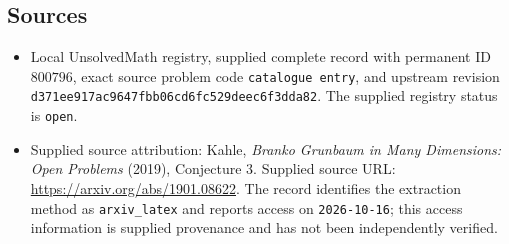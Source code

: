 \documentclass[11pt]{article}
\begin{document}
\subsection{Sources}
\begin{itemize}
\item Local UnsolvedMath registry, supplied complete record with permanent ID \(800796\), exact source problem code \texttt{catalogue entry}, and upstream revision \texttt{d371ee917ac9647fbb06cd6fc529deec6f3dda82}. The supplied registry status is \texttt{open}.
\item Supplied source attribution: Kahle, \emph{Branko Grunbaum in Many Dimensions: Open Problems} (2019), Conjecture 3. Supplied source URL: \url{https://arxiv.org/abs/1901.08622}. The record identifies the extraction method as \texttt{arxiv\_latex} and reports access on \texttt{2026-10-16}; this access information is supplied provenance and has not been independently verified.
\end{itemize}
\end{document}
